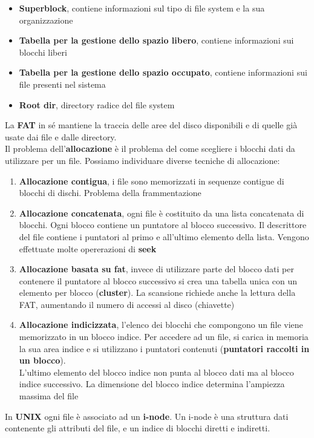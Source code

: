 \documentclass{article}
\begin{document}
\begin{itemize}
  \item \textbf{Superblock}, contiene informazioni sul tipo di file system e la sua organizzazione
  \item \textbf{Tabella per la gestione dello spazio libero}, contiene informazioni sui blocchi liberi
  \item \textbf{Tabella per la gestione dello spazio occupato}, contiene informazioni sui file presenti nel sistema
  \item \textbf{Root dir}, directory radice del file system
\end{itemize}
La \textbf{FAT} in sé mantiene la traccia delle aree del disco disponibili e di quelle già usate dai file e dalle directory.\\
Il problema dell'\textbf{allocazione} è il problema del come scegliere i blocchi dati da utilizzare per un file. Possiamo individuare diverse tecniche di allocazione:
\begin{enumerate}
  \item \textbf{Allocazione contigua}, i file sono memorizzati in sequenze contigue di blocchi di dischi. Problema della frammentazione
  \item \textbf{Allocazione concatenata}, ogni file è costituito da una lista concatenata di blocchi. Ogni blocco contiene un puntatore al blocco successivo. Il descrittore del file contiene i puntatori al primo e all'ultimo elemento della lista. Vengono effettuate molte opererazioni di \textbf{seek}
  \item \textbf{Allocazione basata su fat}, invece di utilizzare parte del blocco dati per contenere il puntatore al blocco successivo si crea una tabella unica con un elemento per blocco (\textbf{cluster}). La scansione richiede anche la lettura della FAT, aumentando il numero di accessi al disco (chiavette)
  \item \textbf{Allocazione indicizzata}, l'elenco dei blocchi che compongono un file viene memorizzato in un blocco indice. Per accedere ad un file, si carica in memoria la sua area indice e si utilizzano i puntatori contenuti (\textbf{puntatori raccolti in un blocco}).\\ L'ultimo elemento del blocco indice non punta al blocco dati ma al blocco indice successivo. La dimensione del blocco indice determina l'ampiezza massima del file
\end{enumerate}
In \textbf{UNIX} ogni file è associato ad un \textbf{i-node}. Un i-node è una struttura dati contenente gli attributi del file, e un indice di blocchi diretti e indiretti. \\
\end{document}
